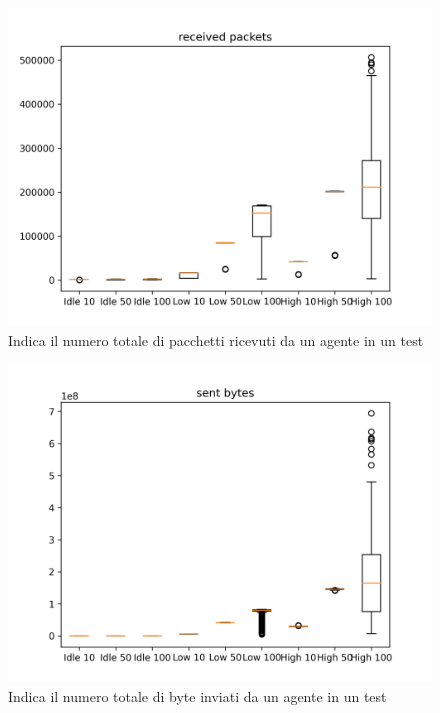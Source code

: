 \documentclass[12pt, a4paper]{article}
\begin{document}
\begin{figure}[H]
    \includegraphics[width=\linewidth, height=0.35\textheight, keepaspectratio]{graphs/received packets.png}
    \caption{Indica il numero totale di pacchetti ricevuti da un agente in un test}
    \label{fig:rp}
\end{figure}

\begin{figure}[H]
    \includegraphics[width=\linewidth, height=0.4\textheight, keepaspectratio]{graphs/sent bytes.png}
    \caption{Indica il numero totale di byte inviati da un agente in un test}
    \label{fig:sb}
\end{figure}
\end{document}

